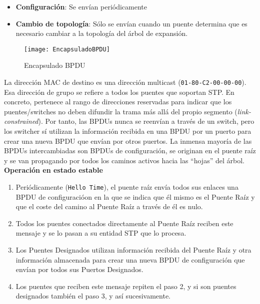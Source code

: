 \documentclass[10pt,portrait, twocolumn]{article}
\begin{document}
	\begin{itemize}
		\item \textbf{Configuración}: Se envían periódicamente
		\item \textbf{Cambio de topología}: Sólo se envían cuando un puente determina que es necesario cambiar a la topología del árbol de expansión.
	\end{itemize}
	
\begin{figure}[!ht]	
	\centering
    	\texttt{[image: EncapsuladoBPDU]}
	\caption{Encapsulado BPDU}
	\label{fig:bpdu}
\end{figure} 
	
La dirección MAC de destino es una dirección multicast (\texttt{01-80-C2-00-00-00}). Esa dirección de grupo se refiere a todos los puentes que soportan STP. En concreto, pertenece al rango de direcciones reservadas para indicar que los puentes/switches no deben difundir la trama más allá del propio segmento (\textit{link-constrained}). Por tanto, las BPDUs nunca se reenvían a través de un switch, pero los switcher sí utilizan la información recibida en una BPDU por un puerto para crear una nueva BPDU que envían por otros puertos. La inmensa mayoría de las BPDUs intercambiadas son BPDUs de configuración, se originan en el puente raíz y se van propagando por todos los caminos activos hacia las ``hojas'' del árbol.\\

\textbf{Operación en estado estable}

	\begin{enumerate}
		\item Periódicamente (\texttt{Hello Time}), el puente raíz envía todos sus enlaces una BPDU de configuracióon en la que se indica que él mismo es el Puente Raíz y que el coste del camino al Puente Raíz a través de él es nulo.
		\item Todos los puentes conectados directamente al Puente Raíz reciben este mensaje y se lo pasan a su entidad STP que lo procesa.
		\item Los Puentes Designados utilizan información recibida del Puente Raíz y otra información almacenada para crear una nueva BPDU de configuración que envían por todos sus Puertos Designados.
		\item Los puentes que reciben este mensaje repiten el paso 2, y si son puentes designados también el paso 3, y así sucesivamente. 
	\end{enumerate}
	
\end{document}

